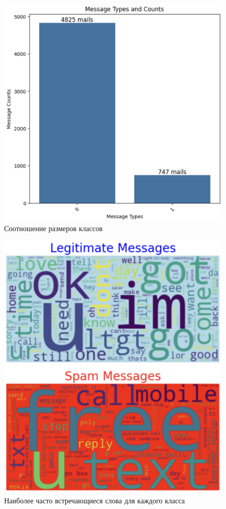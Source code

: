 \begin{figure}
	\begin{center}
		\includegraphics[width=\textwidth]{images/2.png}
	\end{center}
	\caption{Соотношение размеров классов}
	\label{img:2}
\end{figure}

\begin{figure}
	\begin{center}
		\includegraphics[width=\textwidth]{images/3.png}
	\end{center}
	\caption{Наиболее часто встречающиеся слова для каждого класса}
	\label{img:3}
\end{figure}

\clearpage
